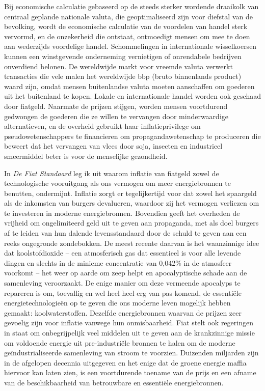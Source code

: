 Bij economische calculatie gebaseerd op de steeds sterker wordende draaikolk van centraal geplande nationale valuta, die geoptimaliseerd zijn voor diefstal van de bevolking, wordt de economische calculatie van de voordelen van handel sterk vervormd, en de onzekerheid die ontstaat, ontmoedigt mensen om mee te doen aan wederzijds voordelige handel. Schommelingen in internationale wisselkoersen kunnen een winstgevende onderneming vernietigen of onrendabele bedrijven onverdiend belonen. De wereldwijde markt voor vreemde valuta verwerkt transacties die vele malen het wereldwijde bbp (bruto binnenlands product) waard zijn, omdat mensen buitenlandse valuta moeten aanschaffen om goederen uit het buitenland te kopen. Lokale en internationale handel worden ook geschaad door fiatgeld. Naarmate de prijzen stijgen, worden mensen voortdurend gedwongen de goederen die ze willen te vervangen door minderwaardige alternatieven, en de overheid gebruikt haar inflatieprivilege om pseudowetenschappers te financieren om propagandawetenschap te produceren die beweert dat het vervangen van vlees door soja, insecten en industrieel smeermiddel beter is voor de menselijke gezondheid.

In \emph{De Fiat Standaard} leg ik uit waarom inflatie van fiatgeld zowel de technologische vooruitgang als ons vermogen om meer energiebronnen te benutten, ondermijnt. Inflatie zorgt er tegelijkertijd voor dat zowel het spaargeld als de inkomsten van burgers devalueren, waardoor zij het vermogen verliezen om te investeren in moderne energiebronnen. Bovendien geeft het overheden de vrijheid om ongelimiteerd geld uit te geven aan propaganda, met als doel burgers af te leiden van hun dalende levensstandaard door de schuld te geven aan een reeks ongegronde zondebokken. De meest recente daarvan is het waanzinnige idee dat koolstofdioxide -- een atmosferisch gas dat essentieel is voor alle levende dingen en slechts in de minieme concentratie van 0,042\% in de atmosfeer voorkomt -- het weer op aarde om zeep helpt en apocalyptische schade aan de samenleving veroorzaakt. De enige manier om deze vermeende apocalyps te \textquotesingle repareren\textquotesingle{} is om, toevallig en wel heel heel erg van pas komend, de essentiële energietechnologieën op te geven die ons moderne leven mogelijk hebben gemaakt: koolwaterstoffen. Dezelfde energiebronnen waarvan de prijzen zeer gevoelig zijn voor inflatie vanwege hun onmisbaarheid. Fiat stelt ook regeringen in staat om onbegrijpelijk veel middelen uit te geven aan de krankzinnige missie om voldoende energie uit pre-industriële bronnen te halen om de moderne geïndustrialiseerde samenleving van stroom te voorzien. Duizenden miljarden zijn in de afgelopen decennia uitgegeven en het enige dat de \textquotesingle groene energie maffia\textquotesingle{} hiervoor kan laten zien, is een voortdurende toename van de prijs en een afname van de beschikbaarheid van betrouwbare en essentiële energiebronnen.

